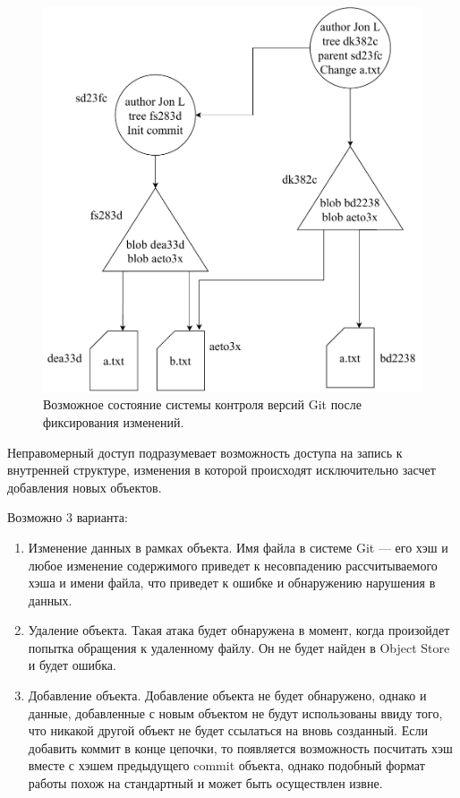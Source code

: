 \begin{figure}[hbtp]
    \centering
    \includegraphics[width=\textwidth]{./img/git-commit.pdf}
    \caption{Возможное состояние системы контроля версий Git после фиксирования изменений.}
    \label{fig:git3}
\end{figure}

Неправомерный доступ подразумевает возможность доступа на запись к внутренней структуре, изменения в которой происходят исключительно засчет добавления новых объектов.

Возможно 3 варианта:
\begin{enumerate}
    \item Изменение данных в рамках объекта. Имя файла в системе Git --- его хэш и любое изменение содержимого приведет к несовпадению рассчитываемого хэша и имени файла, что приведет к ошибке и обнаружению нарушения в данных.
    \item Удаление объекта. Такая атака будет обнаружена в момент, когда произойдет попытка обращения к удаленному файлу. Он не будет найден в Object Store и будет ошибка.
    \item Добавление объекта. Добавление объекта не будет обнаружено, однако и данные, добавленные с новым объектом не будут использованы ввиду того, что никакой другой объект не будет ссылаться на вновь созданный. Если добавить коммит в конце цепочки, то появляется возможность посчитать хэш вместе с хэшем предыдущего commit объекта, однако подобный формат работы похож на стандартный и может быть осуществлен извне.
\end{enumerate}

